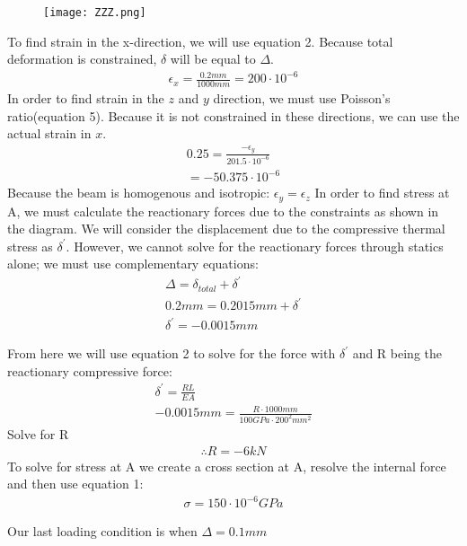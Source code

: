 \documentclass[12pt]{article}
\begin{document}
\begin{figure}[h!]
	\texttt{[image: ZZZ.png]}
\end{figure}

To find strain in the x-direction, we will use equation 2. Because total deformation is constrained, $\delta$ will be equal to $\Delta$.
\begin{gather*}
\epsilon_{x} = \frac{0.2 mm}{1000 mm} = 200 \cdot 10^{-6}
\end{gather*}
In order to find strain in the $z$ and $y$ direction, we must use Poisson's ratio(equation 5). Because it is not constrained in these directions, we can use the actual strain in $x$. 
\begin{gather*}
0.25 = \frac{-\epsilon_{y}}{201.5 \cdot 10^{-6}}\\
=-50.375 \cdot 10^{-6}
\end{gather*}
Because the beam is homogenous and isotropic: $\epsilon_{y} = \epsilon_{z}$
\newline
In order to find stress at A, we must calculate the reactionary forces due to the constraints as shown in the diagram. We will consider the displacement due to the compressive thermal stress as $\delta^{'}$. However, we cannot solve for the reactionary forces through statics alone; we must use complementary equations:
\begin{gather*}
\Delta = \delta_{total} + \delta^{'}\\
0.2 mm = 0.2015 mm + \delta^{'}\\
\delta^{'} = -0.0015 mm
\end{gather*}
\pagebreak

From here we will use equation 2 to solve for the force with $\delta^{'}$ and R being the reactionary compressive force:
\begin{gather*} 
\delta^{'} = \frac{RL}{EA}\\
-0.0015 mm = \frac{R \cdot 1000mm}{100 GPa \cdot 200^{2} mm^{2}}
\end{gather*}
Solve for R
\begin{gather*}
\therefore R = -6 kN
\end{gather*}
To solve for stress at A we create a cross section at A, resolve the internal force and then use equation 1:
\begin{gather*}
\sigma = 150 \cdot 10^{-6} GPa
\end{gather*}

Our last loading condition is when $\Delta = 0.1mm$
\newline
\end{document}

